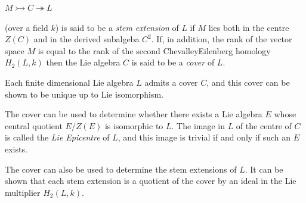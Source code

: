 \documentclass[a4paper,11pt]{report}
\begin{document}
{{$ M \rightarrowtail C \twoheadrightarrow L $ 

 (over a field $k$) is said to be a \emph{stem extension} of $L$ if $M$ lies both in the centre $Z(C)$ and in the derived subalgeba $C^2$. If, in addition, the rank of the vector space $M$ is equal to the rank of the second Chevalley\texttt{}Eilenberg
homology $H_2(L,k)$ then the Lie algebra $C$ is said to be a \emph{cover} of $L$. 

Each finite dimensional Lie algebra $L$ admits a cover $C$, and this cover can be shown to be unique up to Lie isomorphism. 

The cover can be used to determine whether there exists a Lie algebra $E$ whose central quotient $E/Z(E)$ is isomorphic to $L$. The image in $L$ of the centre of $C$ is called the \emph{Lie Epicentre} of $L$, and this image is trivial if and only if such an $E$ exists. 

The cover can also be used to determine the stem extensions of $L$. It can be shown that each stem extension is a quotient of the cover by an
ideal in the Lie multiplier $H_2(L,k)$. 
}}
\end{document}
